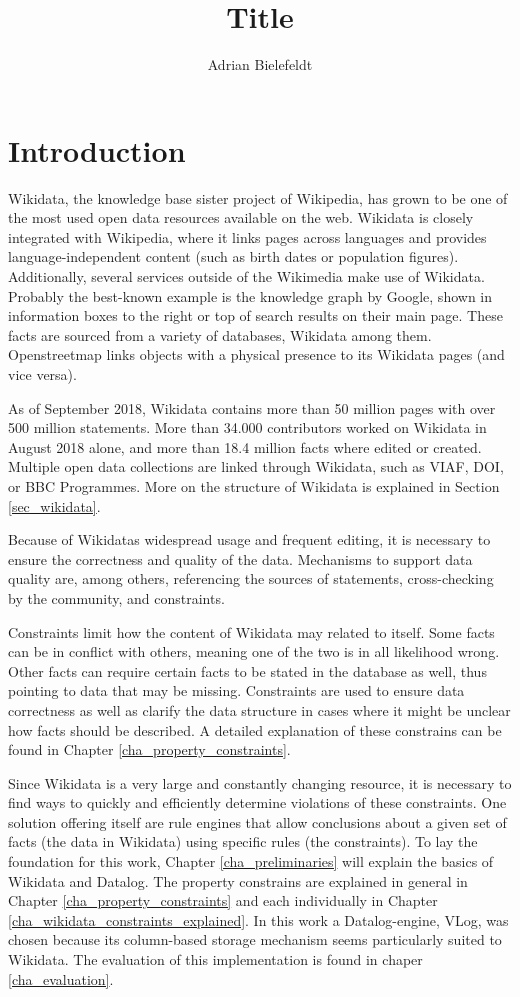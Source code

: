 \documentclass[hyperref,bachelorofscience,fleqn]{cgvpub}
\author{Adrian Bielefeldt}
\title{Title}
\begin{document}
\chapter{Introduction}
Wikidata, the knowledge base sister project of Wikipedia, has grown to be one of the most used open data resources available on the web. Wikidata is closely integrated with Wikipedia, where it links pages across languages and provides language-independent content (such as birth dates or population figures). Additionally, several services outside of the Wikimedia make use of Wikidata.  Probably the best-known example is the knowledge graph by Google, shown in information boxes to the right or top of search results on their main page. These facts are sourced from a variety of databases, Wikidata among them. Openstreetmap links objects with a physical presence to its Wikidata pages (and vice versa). 

As of September 2018, Wikidata contains more than 50 million pages with over 500 million statements. More than 34.000 contributors worked on Wikidata in August 2018 alone, and more than 18.4 million facts where edited or created. Multiple open data collections are linked through Wikidata, such as VIAF, DOI, or BBC Programmes. More on the structure of Wikidata is explained in Section \ref{sec_wikidata}.

Because of Wikidatas widespread usage and frequent editing, it is necessary to ensure the correctness and quality of the data. Mechanisms to support data quality are, among others, referencing the sources of statements, cross-checking by the community, and constraints.

Constraints limit how the content of Wikidata may related to itself. Some facts can be in conflict with others, meaning one of the two is in all likelihood wrong. Other facts can require certain facts to be stated in the database as well, thus pointing to data that may be missing. Constraints are used to ensure data correctness as well as clarify the data structure in cases where it might be unclear how facts should be described. A detailed explanation of these constrains can be found in Chapter \ref{cha_property_constraints}.

Since Wikidata is a very large and constantly changing resource, it is necessary to find ways to quickly and efficiently determine violations of these constraints. One solution offering itself are rule engines that allow conclusions about a given set of facts (the data in Wikidata) using specific rules (the constraints). To lay the foundation for this work, Chapter \ref{cha_preliminaries} will explain the basics of Wikidata and Datalog. The property constrains are explained in general in Chapter \ref{cha_property_constraints} and each individually in Chapter \ref{cha_wikidata_constraints_explained}. In this work a Datalog-engine, VLog, was chosen because its column-based storage mechanism seems particularly suited to Wikidata. The evaluation of this implementation is found in chaper \ref{cha_evaluation}.
\end{document}
